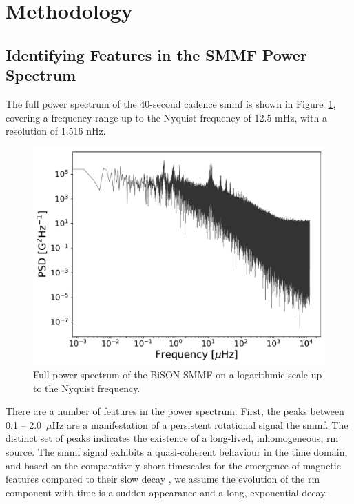 \section{Methodology}\label{sec:SMMF_method}


\subsection{Identifying Features in the SMMF Power Spectrum}

The full power spectrum of the 40-second cadence \gls{smmf} is shown in Figure~\ref{fig:BiSON_FT_full}, covering a frequency range up to the Nyquist frequency of 12.5 mHz, with a resolution of 1.516 nHz. 

\begin{figure}[ht!]
	\centering
	\includegraphics[width=\columnwidth]{BiSON_SMMF_FT_full.pdf}
	\caption{Full power spectrum of the BiSON SMMF on a logarithmic scale up to the Nyquist frequency.}
	\label{fig:BiSON_FT_full}
\end{figure}

There are a number of features in the power spectrum. First, the peaks between 0.1 -- 2.0~$\mu\mathrm{Hz}$ are a manifestation of a persistent rotational signal the \gls{smmf}. The distinct set of peaks indicates the existence of a long-lived, inhomogeneous, \gls{rm} source. The \gls{smmf} signal exhibits a quasi-coherent behaviour in the time domain, and based on the comparatively short timescales for the emergence of magnetic features compared to their slow decay \citep{zwaan_solar_1981, harvey_properties_1993, hathaway_sunspot_2008}, we assume the evolution of the \gls{rm} component with time is a sudden appearance and a long, exponential decay.

